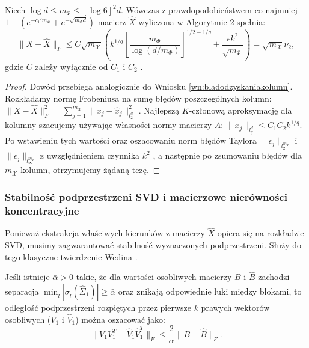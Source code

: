 \begin{wn}\label{wn:bladodzyskaniaX}
Niech $\log d \le m_\Phi \le [\log 6]^2 d$. Wówczas z prawdopodobieństwem co najmniej $1 - (e^{-c_1' m_\Phi} + e^{-\sqrt{m_\Phi d}})$ macierz $\hat{X}$ wyliczona w Algorytmie 2 spełnia:
$$\|X - \hat{X}\|_F \le C\sqrt{m_\mathcal{X}}\left(k^{1/q}\left[\frac{m_\Phi}{\log(d/m_\Phi)}\right]^{1/2 - 1/q} + \frac{\epsilon k^2}{\sqrt{m_\Phi}}\right) = \sqrt{m_\mathcal{X}}\nu_2,$$
gdzie $C$ zależy wyłącznie od $C_1$ i $C_2$ .
\end{wn}

\begin{proof}
Dowód przebiega analogicznie do Wniosku \ref{wn:bladodzyskaniakolumn}. Rozkładamy normę Frobeniusa na sumę błędów poszczególnych kolumn: $\|X - \hat{X}\|_F^2 = \sum_{j=1}^{m_\mathcal{X}} \|x_j - \hat{x}_j\|_{l_2^d}^2$ . Najlepszą $K$-członową aproksymację dla kolumny szacujemy używając własności normy macierzy $A$: $\|x_j\|_{l_q^d} \le C_1 C_2 k^{1/q}$. Po wstawieniu tych wartości oraz oszacowaniu norm błędów Taylora $\|\epsilon_j\|_{l_2^{m_\Phi}}$ i $\|\epsilon_j\|_{l_\infty^{m_\Phi}}$ z uwzględnieniem czynnika $k^2$ , a następnie po zsumowaniu błędów dla $m_\mathcal{X}$ kolumn, otrzymujemy żądaną tezę.
\end{proof}

\subsubsection{Stabilność podprzestrzeni SVD i macierzowe nierówności koncentracyjne}

Ponieważ ekstrakcja właściwych kierunków z macierzy $\hat{X}$ opiera się na rozkładzie SVD, musimy zagwarantować stabilność wyznaczonych podprzestrzeni. Służy do tego klasyczne twierdzenie Wedina \cite{wedin1972perturbation} .

\begin{tw}\label{tw:wedin}
Jeśli istnieje $\bar{\alpha} > 0$ takie, że dla wartości osobliwych macierzy $B$ i $\hat{B}$ zachodzi separacja $ \min_{\hat{l}}|\sigma_{\hat{l}}(\hat{\Sigma}_1)| \ge \bar{\alpha} $ oraz znikają odpowiednie luki między blokami, to odległość podprzestrzeni rozpiętych przez pierwsze $k$ prawych wektorów osobliwych ($V_1$ i $\hat{V}_1$) można oszacować jako:
$$\|V_1 V_1^T - \hat{V}_1 \hat{V}_1^T\|_F \le \frac{2}{\bar{\alpha}}\|B - \hat{B}\|_F.$$

\end{tw}

